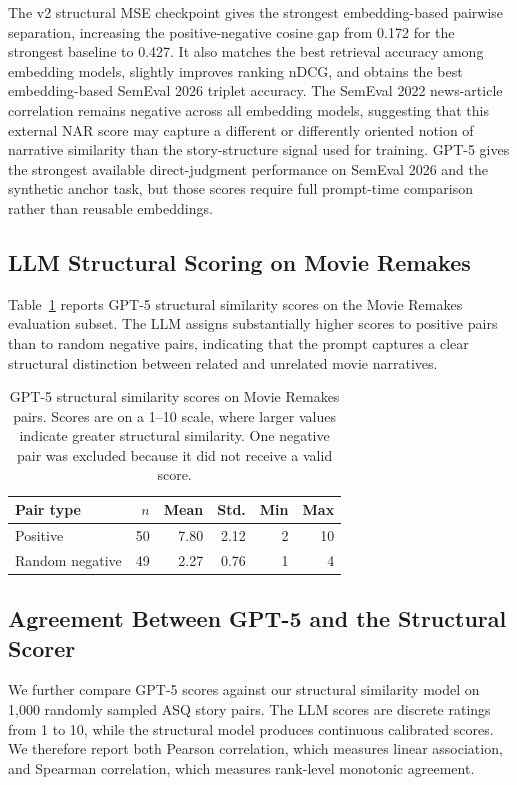 The v2 structural MSE checkpoint gives the strongest embedding-based pairwise separation, increasing the positive-negative cosine gap from 0.172 for the strongest baseline to 0.427. It also matches the best retrieval accuracy among embedding models, slightly improves ranking nDCG, and obtains the best embedding-based SemEval 2026 triplet accuracy. The SemEval 2022 news-article correlation remains negative across all embedding models, suggesting that this external NAR score may capture a different or differently oriented notion of narrative similarity than the story-structure signal used for training. GPT-5 gives the strongest available direct-judgment performance on SemEval 2026 and the synthetic anchor task, but those scores require full prompt-time comparison rather than reusable embeddings.

\subsection{LLM Structural Scoring on Movie Remakes}

Table~\ref{tab:movie-llm-scores} reports GPT-5 structural similarity scores on the Movie Remakes evaluation subset. The LLM assigns substantially higher scores to positive pairs than to random negative pairs, indicating that the prompt captures a clear structural distinction between related and unrelated movie narratives.

\begin{table}[t]
\centering
\small
\begin{tabular}{lrrrrr}
\toprule
Pair type & $n$ & Mean & Std. & Min & Max \\
\midrule
Positive & 50 & 7.80 & 2.12 & 2 & 10 \\
Random negative & 49 & 2.27 & 0.76 & 1 & 4 \\
\bottomrule
\end{tabular}
\caption{GPT-5 structural similarity scores on Movie Remakes pairs. Scores are on a 1--10 scale, where larger values indicate greater structural similarity. One negative pair was excluded because it did not receive a valid score.}
\label{tab:movie-llm-scores}
\end{table}

\subsection{Agreement Between GPT-5 and the Structural Scorer}

We further compare GPT-5 scores against our structural similarity model on 1,000 randomly sampled ASQ story pairs. The LLM scores are discrete ratings from 1 to 10, while the structural model produces continuous calibrated scores. We therefore report both Pearson correlation, which measures linear association, and Spearman correlation, which measures rank-level monotonic agreement.

